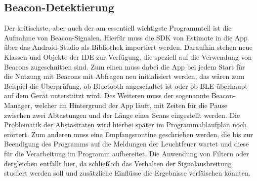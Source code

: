 \subsection{Beacon-Detektierung}
Der kritischste, aber auch der am essentiell wichtigste Programmteil ist die Aufnahme von Beacon-Signalen. Hierfür muss die SDK von Estimote in die App über das Android-Studio als Bibliothek importiert werden. Daraufhin stehen neue Klassen und Objekte der IDE zur Verfügung, die speziell auf die Verwendung von Beacons zugeschnitten sind. Zum einen muss dabei die App bei jedem Start für die Nutzung mit Beacons mit Abfragen neu initialisiert werden, das wären zum Beispiel die Überprüfung, ob Bluetooth angeschaltet ist oder ob BLE überhaupt auf dem Gerät unterstützt wird. Des Weiteren muss der sogenannte Beacon-Manager, welcher im Hintergrund der App läuft, mit Zeiten für die Pause zwischen zwei Abtastungen und der Länge eines Scans eingestellt werden. Die Problematik der Abstastraten wird hierbei später im Programmablaufplan noch erörtert. Zum anderen muss eine Empfangsroutine geschrieben werden, die bis zur Beendigung des Programms auf die Meldungen der Leuchtfeuer wartet und diese für die Verarbeitung im Programm aufbereitet. Die Anwendung von Filtern oder dergleichen entfällt hier, da schließlich das Verhalten der Signalausbreitung studiert werden soll und zusätzliche Einflüsse die Ergebnisse verfälschen könnten.
